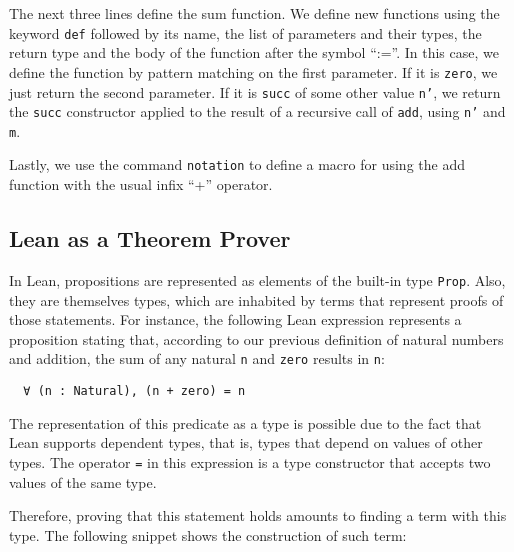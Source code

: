 The next three lines define the sum function. We define new functions using the keyword \texttt{def} followed by its name, the list of parameters and their types, the return type and the body of the function after the symbol ``:=''. In this case, we define the function by pattern matching on the first parameter. If it is \texttt{zero}, we just return the second parameter. If it is \texttt{succ} of some other value \texttt{n'}, we return the \texttt{succ} constructor applied to the result of a recursive call of \texttt{add}, using \texttt{n'} and \texttt{m}.

Lastly, we use the command \texttt{notation} to define a macro for using the add function with the usual infix ``+'' operator.



\subsection{Lean as a Theorem Prover}

In Lean, propositions are represented as elements of the built-in type \texttt{Prop}. Also, they are themselves types, which are inhabited by terms that represent proofs of those statements. For instance, the following Lean expression represents a proposition stating that, according to our previous definition of natural numbers and addition, the sum of any natural \texttt{n} and \texttt{zero} results in \texttt{n}:

\begin{verbatim}
  ∀ (n : Natural), (n + zero) = n
\end{verbatim}

The representation of this predicate as a type is possible due to the fact that Lean supports dependent types, that is, types that depend on values of other types. The operator \texttt{=} in this expression is a type constructor that accepts two values of the same type.

Therefore, proving that this statement holds amounts to finding a term with this type. The following snippet shows the construction of such term:

